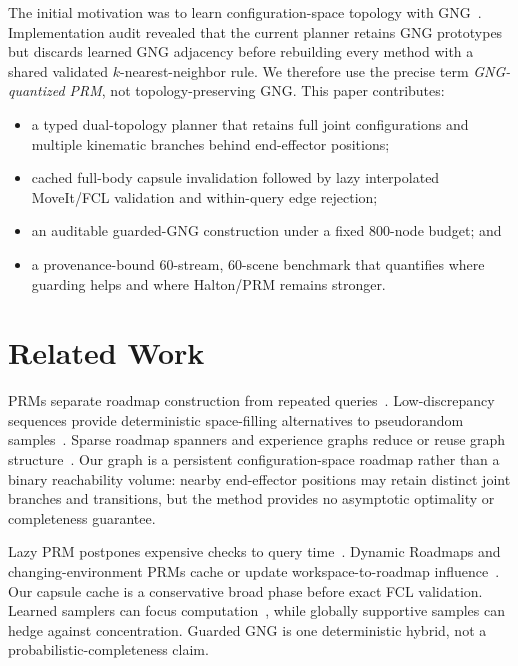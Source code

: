 \documentclass[letterpaper,10pt,conference]{ieeeconf}
\begin{document}
The initial motivation was to learn configuration-space topology with GNG~\cite{fritzke1995}. Implementation audit revealed that the current planner retains GNG prototypes but discards learned GNG adjacency before rebuilding every method with a shared validated $k$-nearest-neighbor rule. We therefore use the precise term \emph{GNG-quantized PRM}, not topology-preserving GNG. This paper contributes:
\begin{itemize}
    \item a typed dual-topology planner that retains full joint configurations and multiple kinematic branches behind end-effector positions;
    \item cached full-body capsule invalidation followed by lazy interpolated MoveIt/FCL validation and within-query edge rejection;
    \item an auditable guarded-GNG construction under a fixed 800-node budget; and
    \item a provenance-bound 60-stream, 60-scene benchmark that quantifies where guarding helps and where Halton/PRM remains stronger.
\end{itemize}

\section{Related Work}
PRMs separate roadmap construction from repeated queries~\cite{kavraki1996}. Low-discrepancy sequences provide deterministic space-filling alternatives to pseudorandom samples~\cite{branicky2001}. Sparse roadmap spanners and experience graphs reduce or reuse graph structure~\cite{dobson2014,phillips2012,coleman2015}. Our graph is a persistent configuration-space roadmap rather than a binary reachability volume: nearby end-effector positions may retain distinct joint branches and transitions, but the method provides no asymptotic optimality or completeness guarantee.

Lazy PRM postpones expensive checks to query time~\cite{bohlin2000}. Dynamic Roadmaps and changing-environment PRMs cache or update workspace-to-roadmap influence~\cite{kallmann2004,jaillet2004}. Our capsule cache is a conservative broad phase before exact FCL validation. Learned samplers can focus computation~\cite{ichter2018,qureshi2019,chamzas2021}, while globally supportive samples can hedge against concentration. Guarded GNG is one deterministic hybrid, not a probabilistic-completeness claim.
\end{document}
